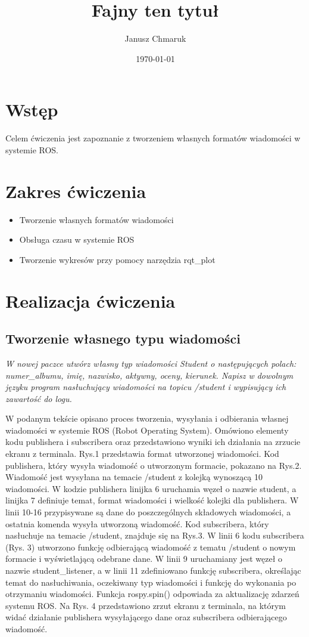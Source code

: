 \documentclass[10pt,a4paper,twoside,twocolumn]{article}%
\title{Fajny ten tytuł}%
\date{\today}%
\author{Janusz Chmaruk}%
\begin{document}

\null%

\clearpage%

\tableofcontents%

\section{Wstęp}
Celem ćwiczenia jest zapoznanie z tworzeniem własnych formatów wiadomości w
systemie ROS.
\section{Zakres ćwiczenia}
\begin{itemize}
    \item Tworzenie własnych formatów wiadomości
    \item Obsługa czasu w systemie ROS
    \item Tworzenie wykresów przy pomocy narzędzia rqt\_plot
\end{itemize}
\section{Realizacja ćwiczenia}
\subsection{Tworzenie własnego typu wiadomości}
\textit{W nowej paczce utwórz własny typ wiadomości Student o następujących
polach: numer\_albumu, imię, nazwisko, aktywny, oceny, kierunek. Napisz w
dowolnym języku program nasłuchujący wiadomości na topicu /student i wypisujący
ich zawartość do logu.}


W podanym tekście opisano proces tworzenia, wysyłania i odbierania własnej
wiadomości w systemie ROS (Robot Operating System). Omówiono elementy kodu
publishera i subscribera oraz przedstawiono wyniki ich działania na zrzucie
ekranu z terminala. Rys.1 przedstawia format utworzonej wiadomości. Kod
publishera, który wysyła wiadomość o utworzonym formacie, pokazano na Rys.2.
Wiadomość jest wysyłana na temacie /student z kolejką wynoszącą 10 wiadomości. W
kodzie publishera linijka 6 uruchamia węzeł o nazwie student, a linijka 7
definiuje temat, format wiadomości i wielkość kolejki dla publishera. W linii
10-16 przypisywane są dane do poszczególnych składowych wiadomości, a ostatnia
komenda wysyła utworzoną wiadomość. Kod subscribera, który nasłuchuje na temacie
/student, znajduje się na Rys.3. W linii 6 kodu subscribera (Rys. 3) utworzono
funkcję odbierającą wiadomość z tematu /student o nowym formacie i wyświetlającą
odebrane dane. W linii 9 uruchamiany jest węzeł o nazwie student\_listener, a w
linii 11 zdefiniowano funkcję subscribera, określając temat do nasłuchiwania,
oczekiwany typ wiadomości i funkcję do wykonania po otrzymaniu wiadomości.
Funkcja rospy.spin() odpowiada za aktualizację zdarzeń systemu ROS. Na Rys. 4
przedstawiono zrzut ekranu z terminala, na którym widać działanie publishera
wysyłającego dane oraz subscribera odbierającego wiadomość.
\end{document}
